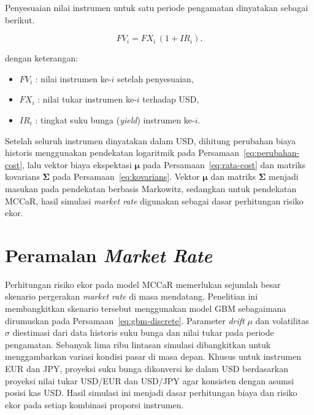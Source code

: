 Penyesuaian nilai instrumen untuk satu periode pengamatan dinyatakan sebagai berikut.

\begin{equation}
    \label{eq:penyesuaian-fv}
    FV_i = FX_i\,(1 + IR_i).
\end{equation}

dengan keterangan:
\begin{itemize}
    \item $FV_i$ : nilai instrumen ke-$i$ setelah penyesuaian,
    \item $FX_i$ : nilai tukar instrumen ke-$i$ terhadap USD,
    \item $IR_i$ : tingkat suku bunga (\textit{yield}) instrumen ke-$i$.
\end{itemize}

Setelah seluruh instrumen dinyatakan dalam USD, dihitung perubahan biaya historis menggunakan pendekatan logaritmik pada Persamaan~\ref{eq:perubahan-cost}, lalu vektor biaya ekspektasi $\boldsymbol{\mu}$ pada Persamaan~\ref{eq:rata-cost} dan matriks kovarians $\boldsymbol{\Sigma}$ pada Persamaan~\ref{eq:kovarians}. Vektor $\boldsymbol{\mu}$ dan matriks $\boldsymbol{\Sigma}$ menjadi masukan pada pendekatan berbasis Markowitz, sedangkan untuk pendekatan MCCaR, hasil simulasi \textit{market rate} digunakan sebagai dasar perhitungan risiko ekor.


\section{Peramalan \textit{Market Rate}}\label{sec:peramalan-rate}
Perhitungan risiko ekor pada model MCCaR memerlukan sejumlah besar skenario pergerakan \textit{market rate} di masa mendatang. Penelitian ini membangkitkan skenario tersebut menggunakan model GBM sebagaimana dirumuskan pada Persamaan~\ref{eq:gbm-discrete}. Parameter \textit{drift} $\mu$ dan volatilitas $\sigma$ diestimasi dari data historis suku bunga dan nilai tukar pada periode pengamatan. Sebanyak lima ribu lintasan simulasi dibangkitkan untuk menggambarkan variasi kondisi pasar di masa depan. Khusus untuk instrumen EUR dan JPY, proyeksi suku bunga dikonversi ke dalam USD berdasarkan proyeksi nilai tukar USD/EUR dan USD/JPY agar konsisten dengan asumsi posisi kas USD. Hasil simulasi ini menjadi dasar perhitungan biaya dan risiko ekor pada setiap kombinasi proporsi instrumen.


